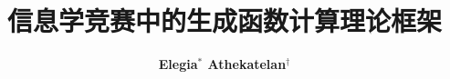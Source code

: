 \documentclass[12pt]{ctexart}
\title{\textbf{\Huge 信息学竞赛中的生成函数计算理论框架%
}}
\author{\textbf{Elegia$^\ast$ Athekatelan$^\dag$}}
\date{}
\theoremstyle{plain}
\theoremstyle{definition}
\newif\ifcont
\begin{document}
\maketitle

\conttrue


\end{document}

